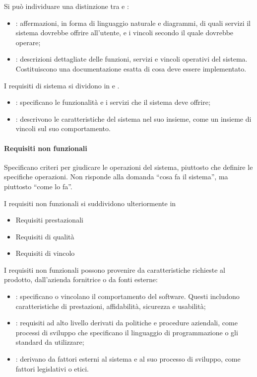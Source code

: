 Si può individuare una distinzione tra  e
:

\begin{itemize}
  \item {}: affermazioni, in forma di linguaggio naturale
    e diagrammi, di quali servizi il sistema dovrebbe offrire all'utente, e i
    vincoli secondo il quale dovrebbe operare;
  \item {}: descrizioni dettagliate delle funzioni,
    servizi e vincoli operativi del sistema. Costituiscono una documentazione
    esatta di cosa deve essere implementato.
\end{itemize}

I requisiti di sistema si dividono in  e
.

\begin{itemize}
    \item {}: specificano le funzionalità e i servizi
      che il sistema deve offrire;
    \item {}: descrivono le caratteristiche del
      sistema nel suo insieme, come un insieme di vincoli sul suo comportamento.
  \end{itemize}

\paragraph{Requisiti non funzionali}
\label{par:requisiti_non_funzionali}

Specificano criteri per giudicare le operazioni del sistema, piuttosto che
definire le specifiche operazioni. Non risponde alla domanda ``cosa fa il
sistema'', ma piuttosto ``come lo fa''.

I requisiti non funzionali si suddividono ulteriormente in

\begin{itemize}
  \item Requisiti prestazionali
  \item Requisiti di qualità
  \item Requisiti di vincolo
\end{itemize}

I requisiti non funzionali possono provenire da caratteristiche richieste al
prodotto, dall'azienda fornitrice o da fonti esterne:

\begin{itemize}
  \item {}: specificano o vincolano
    il comportamento del software. Questi includono caratteristiche di
    prestazioni, affidabilità, sicurezza e usabilità;
  \item {}: requisiti ad alto livello derivati da
    politiche e procedure aziendali, come processi di sviluppo che specificano
    il linguaggio di programmazione o gli standard da utilizzare;
  \item {}: derivano da fattori esterni al sistema e al
    suo processo di sviluppo, come fattori legislativi o etici.
\end{itemize}

